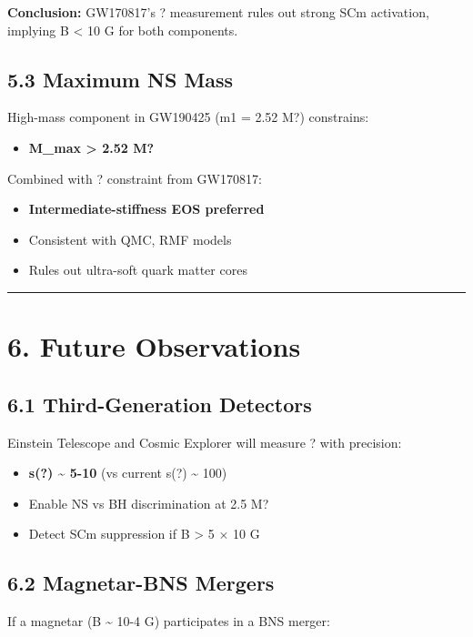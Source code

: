 \documentclass[11pt]{article}
\begin{document}
\textbf{Conclusion:} GW170817's ? measurement rules out strong SCm activation, implying B < 10 G for both components.

\subsection*{5.3 Maximum NS Mass}

High-mass component in GW190425 (m1 = 2.52 M?) constrains:

\begin{itemize}
  \item \textbf{M\_max > 2.52 M?}
\end{itemize}

Combined with ? constraint from GW170817:

\begin{itemize}
  \item \textbf{Intermediate-stiffness EOS preferred}
  \item Consistent with QMC, RMF models
  \item Rules out ultra-soft quark matter cores
\end{itemize}

\noindent\rule{\textwidth}{0.4pt}

\section*{6. Future Observations}

\subsection*{6.1 Third-Generation Detectors}

Einstein Telescope and Cosmic Explorer will measure ? with precision:

\begin{itemize}
  \item \textbf{s(?) \textasciitilde{} 5-10} (vs current s(?) \textasciitilde{} 100)
  \item Enable NS vs BH discrimination at 2.5 M?
  \item Detect SCm suppression if B > 5 $\times$ 10 G
\end{itemize}

\subsection*{6.2 Magnetar-BNS Mergers}

If a magnetar (B \textasciitilde{} 10-4 G) participates in a BNS merger:
\end{document}
